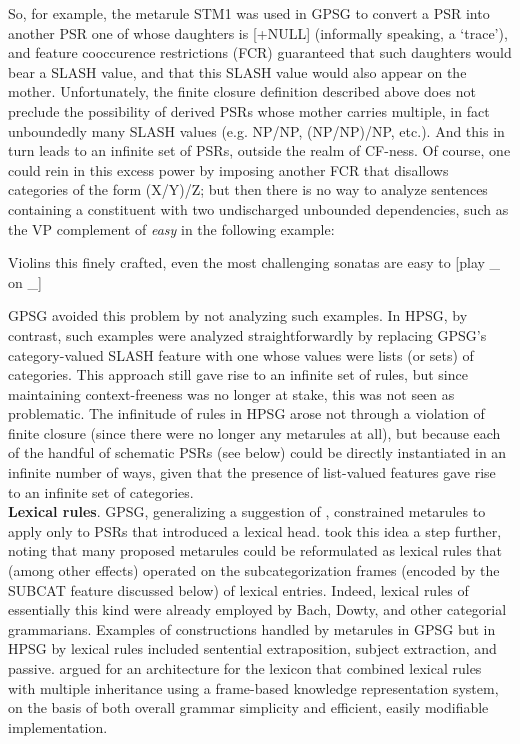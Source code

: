\documentclass[output=paper]{langsci/langscibook}
\begin{document}
So, for example, the metarule STM1 was used in GPSG to convert a PSR into another PSR one of whose daughters is [+NULL] (informally speaking, a `trace'), and feature cooccurence restrictions (FCR) guaranteed that such daughters would bear a SLASH value, and that this SLASH value would also appear on the mother. Unfortunately, the finite closure definition described above does not preclude the possibility of derived PSRs whose mother carries multiple, in fact unboundedly many
SLASH values (e.g. NP/NP, (NP/NP)/NP, etc.). And this in turn leads to an infinite set of PSRs, outside the realm of CF-ness.  Of course, one could rein in this excess power by imposing another FCR that disallows categories of the form (X/Y)/Z; but then there is no way to analyze sentences containing a constituent with two undischarged unbounded dependencies, such as the VP complement of {\em easy} in the following example:

\ea
\label{ex-violins}
Violins this finely crafted, even the most challenging sonatas are easy to [play \_ on \_]
\z

\noindent
GPSG avoided this problem by not analyzing such examples. In HPSG, by contrast, such examples were analyzed straightforwardly by replacing GPSG's category-valued SLASH feature with one whose values were lists (or sets) of categories. This approach still gave rise to an infinite set of rules, but since maintaining context-freeness was no longer at stake, this was not seen as problematic. The infinitude of rules in HPSG arose not through a violation of finite closure (since there were no longer any metarules at all), but because each of the handful of schematic PSRs (see below) could be directly instantiated in an infinite number of ways, given that the presence of list-valued
features gave rise to an infinite set of categories.\\

\noindent
{\bf Lexical rules}. GPSG, generalizing a suggestion of \citet{Flickinger1983}, constrained metarules to apply only to PSRs that introduced a lexical head. \citet{Pollard85a-u} took this idea a step further, noting that many proposed metarules could be reformulated as lexical rules that (among other effects) operated on the subcategorization frames (encoded by the SUBCAT feature discussed below) of lexical entries. Indeed, lexical rules of essentially this kind were already employed by Bach, Dowty, and other categorial grammarians. Examples of constructions handled by metarules in GPSG but in HPSG by lexical rules included sentential extraposition, subject extraction, and passive. \citet{FPW85a} argued for an architecture for the lexicon that combined lexical rules with multiple inheritance using a
frame-based knowledge representation system, on the basis of both overall grammar simplicity and efficient, easily modifiable implementation.\\
\end{document}
